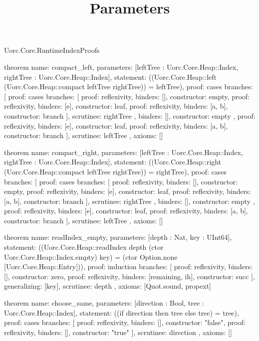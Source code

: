 \begin{lexlean}{Uorc.Core.RuntimeIndexProofs}
\title{Parameters}
\begin{semanticmodule}
theorem{
  name: compact_left,
  parameters: [leftTree : Uorc.Core.Heap::Index, rightTree : Uorc.Core.Heap::Index],
  statement: ((Uorc.Core.Heap::left (Uorc.Core.Heap::compact leftTree rightTree)) = leftTree),
  proof: cases{
    branches: [
      {
        proof: cases{
          branches: [
            {proof: reflexivity{}, binders: [], constructor: empty},
            {proof: reflexivity{}, binders: [e], constructor: leaf},
            {proof: reflexivity{}, binders: [a, b], constructor: branch}
          ],
          scrutinee: rightTree
        },
        binders: [],
        constructor: empty
      },
      {proof: reflexivity{}, binders: [e], constructor: leaf},
      {proof: reflexivity{}, binders: [a, b], constructor: branch}
    ],
    scrutinee: leftTree
  },
  axioms: []
}

theorem{
  name: compact_right,
  parameters: [leftTree : Uorc.Core.Heap::Index, rightTree : Uorc.Core.Heap::Index],
  statement: ((Uorc.Core.Heap::right (Uorc.Core.Heap::compact leftTree rightTree)) = rightTree),
  proof: cases{
    branches: [
      {
        proof: cases{
          branches: [
            {proof: reflexivity{}, binders: [], constructor: empty},
            {proof: reflexivity{}, binders: [e], constructor: leaf},
            {proof: reflexivity{}, binders: [a, b], constructor: branch}
          ],
          scrutinee: rightTree
        },
        binders: [],
        constructor: empty
      },
      {proof: reflexivity{}, binders: [e], constructor: leaf},
      {proof: reflexivity{}, binders: [a, b], constructor: branch}
    ],
    scrutinee: leftTree
  },
  axioms: []
}

theorem{
  name: readIndex_empty,
  parameters: [depth : Nat, key : UInt64],
  statement: ((Uorc.Core.Heap::readIndex depth (ctor Uorc.Core.Heap::Index.empty) key) = (ctor Option.none [Uorc.Core.Heap::Entry])),
  proof: induction{
    branches: [
      {proof: reflexivity{}, binders: [], constructor: zero},
      {proof: reflexivity{}, binders: [remaining, ih], constructor: succ}
    ],
    generalizing: [key],
    scrutinee: depth
  },
  axioms: [Quot.sound, propext]
}

theorem{
  name: choose_same,
  parameters: [direction : Bool, tree : Uorc.Core.Heap::Index],
  statement: ((if direction then tree else tree) = tree),
  proof: cases{
    branches: [
      {proof: reflexivity{}, binders: [], constructor: "false"},
      {proof: reflexivity{}, binders: [], constructor: "true"}
    ],
    scrutinee: direction
  },
  axioms: []
}


\end{semanticmodule}
\end{lexlean}
